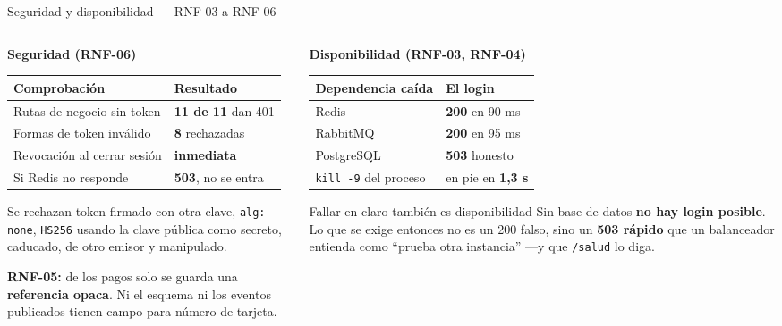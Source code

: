 \documentclass[aspectratio=169,10pt,xcolor={table}]{beamer}
\newcommand{\cifra}[1]{{\color{hexaacento}\textbf{#1}}}
\begin{document}
\begin{frame}{Seguridad y disponibilidad --- RNF-03 a RNF-06}
  \scriptsize
  \begin{columns}[T]
    \begin{column}{0.5\textwidth}
      \textbf{Seguridad (RNF-06)}
      \begin{tabular}{L{3.4cm}C{2.3cm}}
        \toprule
        \textbf{Comprobación} & \textbf{Resultado} \\
        \midrule
        Rutas de negocio sin token & \cifra{11 de 11} dan 401 \\
        Formas de token inválido & \cifra{8} rechazadas \\
        Revocación al cerrar sesión & \cifra{inmediata} \\
        Si Redis no responde & \cifra{503}, no se entra \\
        \bottomrule
      \end{tabular}
      \vspace{0.4em}

      Se rechazan token firmado con otra clave, \texttt{alg: none}, \texttt{HS256} usando la clave
      pública como secreto, caducado, de otro emisor y manipulado.

      \vspace{0.3em}
      \textbf{RNF-05:} de los pagos solo se guarda una \textbf{referencia opaca}. Ni el esquema ni
      los eventos publicados tienen campo para número de tarjeta.
    \end{column}
    \begin{column}{0.48\textwidth}
      \textbf{Disponibilidad (RNF-03, RNF-04)}
      \begin{tabular}{L{3.2cm}C{2.5cm}}
        \toprule
        \textbf{Dependencia caída} & \textbf{El login} \\
        \midrule
        Redis & \cifra{200} en 90 ms \\
        RabbitMQ & \cifra{200} en 95 ms \\
        PostgreSQL & \cifra{503} honesto \\
        \midrule
        \texttt{kill -9} del proceso & en pie en \cifra{1,3 s} \\
        \bottomrule
      \end{tabular}
      \vspace{0.5em}

      \begin{block}{Fallar en claro también es disponibilidad}
        \scriptsize Sin base de datos \textbf{no hay login posible}. Lo que se exige entonces no es
        un 200 falso, sino un \textbf{503 rápido} que un balanceador entienda como ``prueba otra
        instancia'' ---y que \texttt{/salud} lo diga.
      \end{block}
    \end{column}
  \end{columns}
\end{frame}
\end{document}
